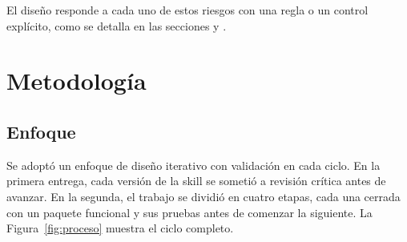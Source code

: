 \documentclass[12pt,letterpaper]{article}
\begin{document}
El diseño responde a cada uno de estos riesgos con una regla o un control explícito, como se detalla en las secciones  y .

\section{Metodología}
\label{sec:metodologia}

\subsection{Enfoque}

Se adoptó un enfoque de diseño iterativo con validación en cada ciclo. En la primera entrega, cada versión de la skill se sometió a revisión crítica antes de avanzar. En la segunda, el trabajo se dividió en cuatro etapas, cada una cerrada con un paquete funcional y sus pruebas antes de comenzar la siguiente. La Figura~\ref{fig:proceso} muestra el ciclo completo.
\end{document}
